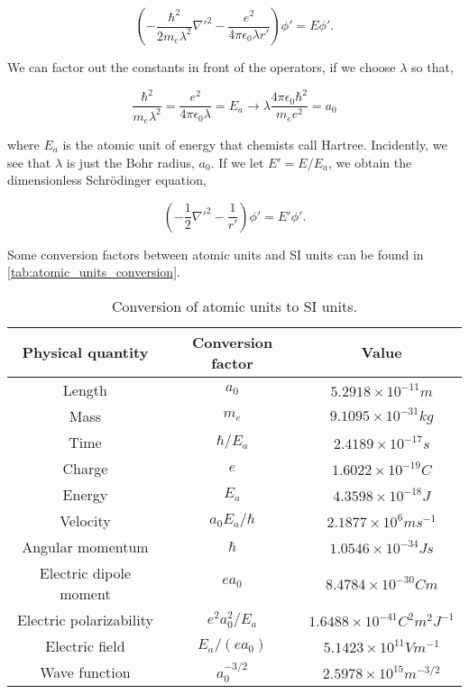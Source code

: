         \begin{equation}
            \left(-\frac{\hbar^2}{2m_e\lambda^2}\nabla'^2 - \frac{e^2}{4\pi\epsilon_0\lambda r'} \right)
            \phi' = E\phi'.
        \end{equation}

        We can factor out the constants in front of the operators, if we choose $\lambda$ so that,

        \begin{equation}
            \frac{\hbar^2}{m_e\lambda^2} = \frac{e^2}{4\pi \epsilon_0 \lambda} = E_a
            \to \lambda \frac{4\pi\epsilon_0\hbar^2}{m_e e^2} = a_0
        \end{equation}

        where $E_a$ is the atomic unit of energy that chemists call Hartree. Incidently,
        we see that $\lambda$ is just the Bohr radius, $a_0$. If we let $E' = E/E_a$, we 
        obtain the dimensionless Schrödinger equation,

        \begin{equation}
            \left(-\frac{1}{2}\nabla'^2 - \frac{1}{r'} \right) \phi' = E'\phi'.
        \end{equation}

        Some conversion factors between atomic units and SI units can be found in
        \autoref{tab:atomic_units_conversion}.

        \begin{table}
            \centering
            \caption{Conversion of atomic units to SI units.}
            \begin{tabular}{ccc} \hline
                Physical quantity & Conversion factor & Value \\ \hline
                Length  & $a_0$ & $5.2918 \times 10^{-11} m$ \\
                Mass    & $m_e$ & $9.1095 \times 10^{-31} kg$ \\
                Time    & $\hbar/E_a$ & $2.4189 \times 10^{-17} s$ \\
                Charge  & $e$   & $1.6022 \times 10^{-19} C$ \\
                Energy  & $E_a$ & $4.3598 \times 10^{-18} J$ \\
                Velocity& $a_0E_a/\hbar$ & $2.1877 \times 10^{6} ms^{-1}$ \\
                Angular momentum & $\hbar$ &  $1.0546 \times 10^{-34} Js$ \\
                Electric dipole moment & $ea_0$& $8.4784 \times 10^{-30} Cm$ \\
                Electric polarizability & $e^2a_0^2/E_a$ & $1.6488 \times 10^{-41} C^2m^2J^{-1}$ \\
                Electric field & $E_a/(ea_0)$ & $5.1423 \times 10^{11} Vm^{-1} $ \\
                Wave function & $a_0^{-3/2}$ & $2.5978 \times 10^{15} m^{-3/2}$ \\ \hline
            \end{tabular}
            \label{tab:atomic_units_conversion}
        \end{table}


